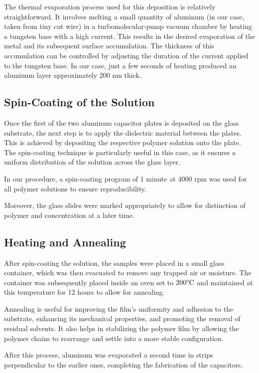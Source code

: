 The thermal evaporation process used for this deposition is relatively straightforward. It involves melting a small quantity of aluminum (in our case, taken from tiny cut wire) in a turbomolecular-pump vacuum chamber by heating a tungsten base with a high current. This results in the desired evaporation of the metal and its subsequent surface accumulation. The thickness of this accumulation can be controlled by adjusting the duration of the current applied to the tungsten base. In our case, just a few seconds of heating produced an aluminum layer approximately 200 nm thick.
\subsection{Spin-Coating of the Solution}

Once the first of the two aluminum capacitor plates is deposited on the glass substrate, the next step is to apply the dielectric material between the plates. This is achieved by depositing the respective polymer solution onto the plate. The spin-coating technique is particularly useful in this case, as it ensures a uniform distribution of the solution across the glass layer.

In our procedure, a spin-coating program of 1 minute at 4000 rpm was used for all polymer solutions to ensure reproducibility.

Moreover, the glass slides were marked appropriately to allow for distinction of polymer and concentration at a later time.

\subsection{Heating and Annealing}

After spin-coating the solution, the samples were placed in a small glass container, which was then evacuated to remove any trapped air or moisture. The container was subsequently placed inside an oven set to $200 \degree \text{C}$ and maintained at this temperature for 12 hours to allow for annealing.

Annealing is useful for improving the film's uniformity and adhesion to the substrate, enhancing its mechanical properties, and promoting the removal of residual solvents. It also helps in stabilizing the polymer film by allowing the polymer chains to rearrange and settle into a more stable configuration.


After this process, aluminum was evaporated a second time in strips perpendicular to the earlier ones, completing the fabrication of the capacitors.


